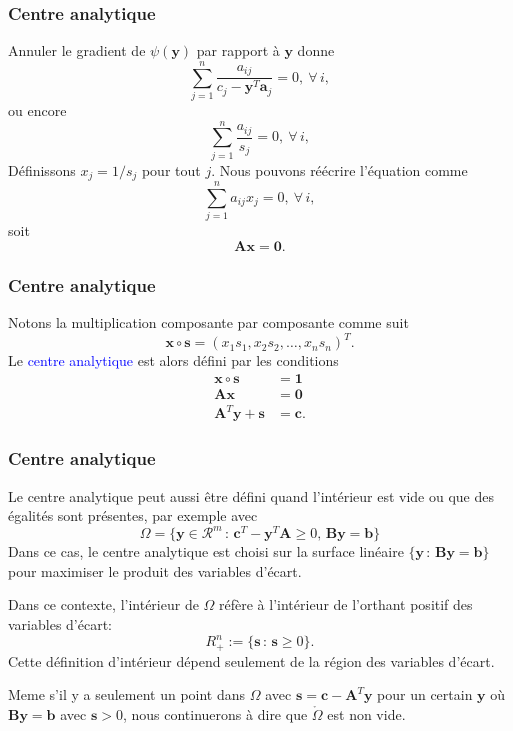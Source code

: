 \documentclass[usepdftitle=false, aspectratio=169]{beamer}
\def\ba{\boldsymbol{a}}
\def\bb{\boldsymbol{b}}
\def\bc{\boldsymbol{c}}
\def\bs{\boldsymbol{s}}
\def\bx{\boldsymbol{x}}
\def\by{\boldsymbol{y}}
\def\bA{\boldsymbol{A}}
\def\bB{\boldsymbol{B}}
\def\bzero{\boldsymbol{0}}
\def\bone{\boldsymbol{1}}
\def\RR{\mathcal{R}}
\begin{document}
\begin{frame}
\frametitle{Centre analytique}

Annuler le gradient de $\psi(\by)$ par rapport à $\by$ donne
\[
\sum_{j = 1}^n \frac{a_{ij}}{c_j - \by^T\ba_j} = 0,\ \forall\, i,
\]
ou encore
\[
\sum_{j = 1}^n \frac{a_{ij}}{s_j} = 0,\ \forall\, i,
\]
Définissons $x_j = 1/s_j$ pour tout $j$. Nous pouvons réécrire l'équation comme
$$
\sum_{j = 1}^n a_{ij}x_j = 0,\ \forall\, i,
$$
soit
$$
\bA\bx = \bzero.
$$

\end{frame}

\begin{frame}
\frametitle{Centre analytique}

Notons la multiplication composante par composante comme suit
\[
\bx \circ \bs = (x_1s_1, x_2s_2, \ldots, x_ns_n)^T.
\]
Le \textcolor{blue}{centre analytique} est alors défini par les conditions
\begin{align*}
\bx \circ \bs &= \bone \\
\bA\bx &= \bzero \\
\bA^T\by + \bs & = \bc.
\end{align*}

\end{frame}

\begin{frame}
\frametitle{Centre analytique}

Le centre analytique peut aussi être défini quand l'intérieur est vide ou que des égalités sont présentes, par exemple avec
\[
\Omega = \lbrace \by \in \RR^m \,:\, \bc^T-\by^T\bA \geq 0,\, \bB\by = \bb \rbrace
\]
Dans ce cas, le centre analytique est choisi sur la surface linéaire $\lbrace \by \,:\, \bB\by = \bb \rbrace$ pour maximiser le produit des variables d'écart.

\mbox{}

Dans ce contexte, l'intérieur de $\Omega$ réfère à l'intérieur de l'orthant positif des variables d'écart:
\[
R^n_+ := \lbrace \bs \,:\, \bs \geq 0 \rbrace.
\]
Cette définition d'intérieur dépend seulement de la région des variables d'écart.

\mbox{}

Meme s'il y a seulement un point dans $\Omega$ avec $\bs = \bc - \bA^T\by$ pour un certain $\by$ où $\bB\by = \bb$ avec $\bs > 0$, nous continuerons à dire que $\mathring{\Omega}$ est non vide.

\end{frame}
\end{document}
